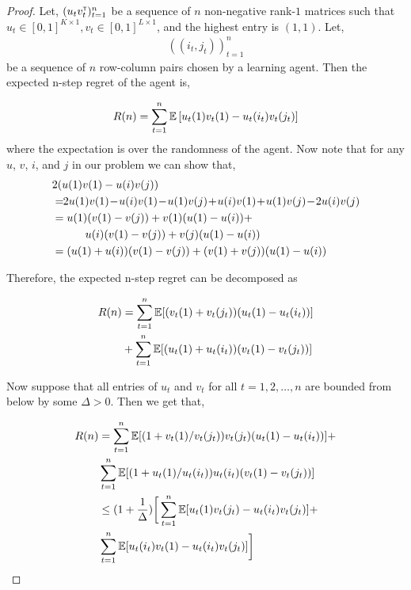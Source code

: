 \begin{proof}
Let, $(u_t v_t^\mathsf{\scriptscriptstyle T})_{t = 1}^n$ be a sequence of $n$ non-negative rank-$1$  matrices such that $u_t \in [0, 1]^{K \times 1}, v_t \in [0, 1]^{L \times 1}$, and the highest entry is $(1, 1)$. Let,
\begin{align*}
((i_t, j_t))_{t = 1}^n
\end{align*}
be a sequence of $n$ row-column pairs chosen by a learning agent. Then the expected n-step regret of the agent is,


\begin{align*}
R(n) = \sum_{t = 1}^n \mathbb{E} \left[{u_t(1) v_t(1) - u_t(i_t) v_t(j_t)}\right]
\end{align*}
where the expectation is over the randomness of the agent. Now note that for any $u$, $v$, $i$, and $j$ in our problem we can show that,
\begin{align*}
& 2 (u(1) v(1) - u(i) v(j))\\
& = \!\! 2 u(1) v(1) \! - \! u(i) v(1) \! - \! u(1) v(j) \! + \! u(i) v(1) \! + \! u(1) v(j) \! - \! 2 u(i) v(j) \\
& = u(1) (v(1) - v(j))  + v(1) (u(1) -  u(i))  +\\
& \hspace*{3em}  u(i) (v(1)  - v(j))  + v(j) (u(1)  - u(i)) \\
& = (u(1) + u(i)) (v(1) - v(j)) + (v(1) + v(j)) (u(1) - u(i))
\end{align*}

Therefore, the expected n-step regret can be decomposed as

\begin{align*}
R(n) &= \sum_{t = 1}^n \mathbb{E}[{(v_t(1) + v_t(j_t)) (u_t(1) - u_t(i_t))}] \\
&+ \sum_{t = 1}^n \mathbb{E}[{(u_t(1) + u_t(i_t)) (v_t(1) - v_t(j_t))}]
\end{align*}

Now suppose that all entries of $u_t$ and $v_t$ for all $t=1,2,\ldots, n$ are bounded from below by some $\Delta > 0$. Then we get that,

\begin{align*}
R(n)
& = \sum_{t = 1}^n \mathbb{E}[{(1 + v_t(1) / v_t(j_t)) v_t(j_t) (u_t(1) - u_t(i_t))}] +\\
&\sum_{t = 1}^n \mathbb{E}[{(1 + u_t(1) / u_t(i_t)) u_t(i_t) (v_t(1) - v_t(j_t))}] \\
& \leq (1 + \frac{1}{\Delta}) \bigg[\sum_{t = 1}^n \mathbb{E}[{u_t(1) v_t(j_t) - u_t(i_t) v_t(j_t)}] + \\
& \sum_{t = 1}^n \mathbb{E}[{u_t(i_t) v_t(1) - u_t(i_t) v_t(j_t)}]\bigg]
\end{align*}


\end{proof}

